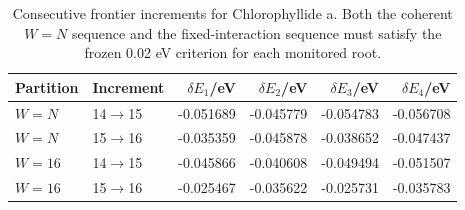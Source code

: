 \begin{table}[!htbp]\centering\small
\caption{Consecutive frontier increments for Chlorophyllide a. Both the coherent $W=N$ sequence and the fixed-interaction sequence must satisfy the frozen 0.02 eV criterion for each monitored root.}
\begin{tabular}{llrrrr}\toprule
Partition & Increment & $\delta E_1$/eV & $\delta E_2$/eV & $\delta E_3$/eV & $\delta E_4$/eV\\\midrule
$W=N$ & 14$\to$15 & -0.051689 & -0.045779 & -0.054783 & -0.056708\\
$W=N$ & 15$\to$16 & -0.035359 & -0.045878 & -0.038652 & -0.047437\\
$W=16$ & 14$\to$15 & -0.045866 & -0.040608 & -0.049494 & -0.051507\\
$W=16$ & 15$\to$16 & -0.025467 & -0.035622 & -0.025731 & -0.035783\\
\bottomrule\end{tabular}
\end{table}
